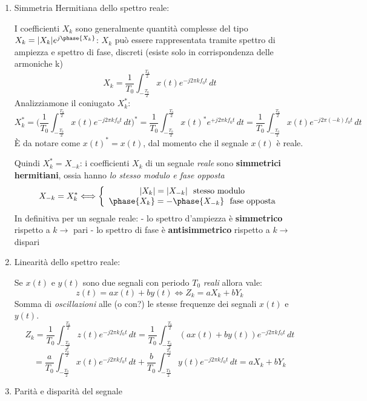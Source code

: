 \documentclass[
  paper=a4,
  ,captions=tableheading
]{scrartcl}
\begin{document}
\begin{enumerate}
\def\labelenumi{\arabic{enumi}.}
\setcounter{enumi}{5}
\item
  Simmetria Hermitiana dello spettro reale:

  I coefficienti \(X_k\) sono generalmente quantità complesse del tipo
  \(X_k = |X_{k}|e^{j\phase{X_{k}}}\): \(X_{k}\) può essere
  rappresentata tramite spettro di ampiezza e spettro di fase, discreti
  (esiste solo in corrispondenza delle armoniche k) \[
   X_k = \frac{1}{T_0} \int_{-\frac{T_0}{2}}^{\frac{T_0}{2}} x(t) e^{-j2\pi kf_{0}t} \,dt
   \] Analizziamone il coniugato \(X^{*}_{k}\): \[
   X_k^{*} = \Big(\frac{1}{T_0} \int_{-\frac{T_0}{2}}^{\frac{T_0}{2}} x(t) e^{-j2\pi kf_{0}t} \,dt \Big)^{*} = \frac{1}{T_0} \int_{-\frac{T_0}{2}}^{\frac{T_0}{2}} x(t)^{*} e^{+j2\pi kf_{0}t} \,dt = \frac{1}{T_0} \int_{-\frac{T_0}{2}}^{\frac{T_0}{2}} x(t) e^{-j2\pi (-k)f_{0}t} \,dt
   \] È da notare come \(x(t)^{*}=x(t)\), dal momento che il segnale
  \(x(t)\) è reale.

  Quindi \(X_{k}^{*}=X_{-k}\): i coefficienti \(X_k\) di un segnale
  \emph{reale} sono \textbf{simmetrici hermitiani}, ossia hanno \emph{lo
  stesso modulo e fase opposta} \[
   X_{-k}=X_{k}^{*} \Longleftrightarrow \left\{ \begin{array}{cl}
   |X_k|=|X_{-k}| \ \text{ stesso modulo}  \\
   \phase{X_{k}} = -\phase{X_{-k}} \ \text{ fase opposta}
   \end{array} \right.
   \] In definitiva per un segnale reale: - lo spettro d'ampiezza è
  \textbf{simmetrico} rispetto a \(k \to\) pari - lo spettro di fase è
  \textbf{antisimmetrico} rispetto a \(k \to\) dispari
\item
  Linearità dello spettro reale:

  Se \(x(t)\) e \(y(t)\) sono due segnali con periodo \(T_0\)
  \emph{reali} allora vale: \[
   z(t)=ax(t)+by(t) \Longleftrightarrow Z_{k} = aX_{k} + bY_{k}
   \] Somma di \emph{oscillazioni} alle (o con?) le stesse frequenze dei
  segnali \(x(t)\) e \(y(t)\). \[
   Z_{k} = \frac{1}{T_0} \int_{-\frac{T_0}{2}}^{\frac{T_0}{2}} z(t) e^{-j2\pi kf_{0}t} \,dt = \frac{1}{T_0} \int_{-\frac{T_0}{2}}^{\frac{T_0}{2}} (ax(t)+by(t)) e^{-j2\pi kf_{0}t} \,dt 
   \] \[
   = \frac{a}{T_0} \int_{-\frac{T_0}{2}}^{\frac{T_0}{2}} x(t) e^{-j2\pi kf_{0}t} \,dt + \frac{b}{T_0} \int_{-\frac{T_0}{2}}^{\frac{T_0}{2}} y(t) e^{-j2\pi kf_{0}t} \,dt = aX_{k}+bY_{k}
   \]
\item
  Parità e disparità del segnale


\end{enumerate}
\end{document}
